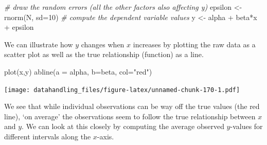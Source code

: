\documentclass[
  12pt,
]{style/krantz}
\newenvironment{Shaded}{\begin{snugshade}}{\end{snugshade}}
\newcommand{\AttributeTok}[1]{\textcolor[rgb]{0.77,0.63,0.00}{#1}}
\newcommand{\CommentTok}[1]{\textcolor[rgb]{0.56,0.35,0.01}{\textit{#1}}}
\newcommand{\DecValTok}[1]{\textcolor[rgb]{0.00,0.00,0.81}{#1}}
\newcommand{\FunctionTok}[1]{\textcolor[rgb]{0.00,0.00,0.00}{#1}}
\newcommand{\NormalTok}[1]{#1}
\newcommand{\OtherTok}[1]{\textcolor[rgb]{0.56,0.35,0.01}{#1}}
\newcommand{\SpecialCharTok}[1]{\textcolor[rgb]{0.00,0.00,0.00}{#1}}
\newcommand{\StringTok}[1]{\textcolor[rgb]{0.31,0.60,0.02}{#1}}
\begin{document}
\begin{Shaded}
\begin{Highlighting}[]
\CommentTok{\# draw the random errors (all the other factors also affecting y)}
\NormalTok{epsilon }\OtherTok{\textless{}{-}} \FunctionTok{rnorm}\NormalTok{(N, }\AttributeTok{sd=}\DecValTok{10}\NormalTok{)}
\CommentTok{\# compute the dependent variable values}
\NormalTok{y }\OtherTok{\textless{}{-}}\NormalTok{ alpha }\SpecialCharTok{+}\NormalTok{ beta}\SpecialCharTok{*}\NormalTok{x }\SpecialCharTok{+}\NormalTok{ epsilon}
\end{Highlighting}
\end{Shaded}

We can illustrate how \(y\) changes when \(x\) increases by plotting the raw data as a scatter plot as well as the true relationship (function) as a line.

\begin{Shaded}
\begin{Highlighting}[]
\FunctionTok{plot}\NormalTok{(x,y)}
\FunctionTok{abline}\NormalTok{(}\AttributeTok{a =}\NormalTok{ alpha, }\AttributeTok{b=}\NormalTok{beta, }\AttributeTok{col=}\StringTok{"red"}\NormalTok{)}
\end{Highlighting}
\end{Shaded}

\texttt{[image: datahandling\_files/figure-latex/unnamed-chunk-170-1.pdf]}

We see that while individual observations can be way off the true values (the red line), `on average' the observations seem to follow the true relationship between \(x\) and \(y\). We can look at this closely by computing the average observed \(y\)-values for different intervals along the \(x\)-axis.
\end{document}
